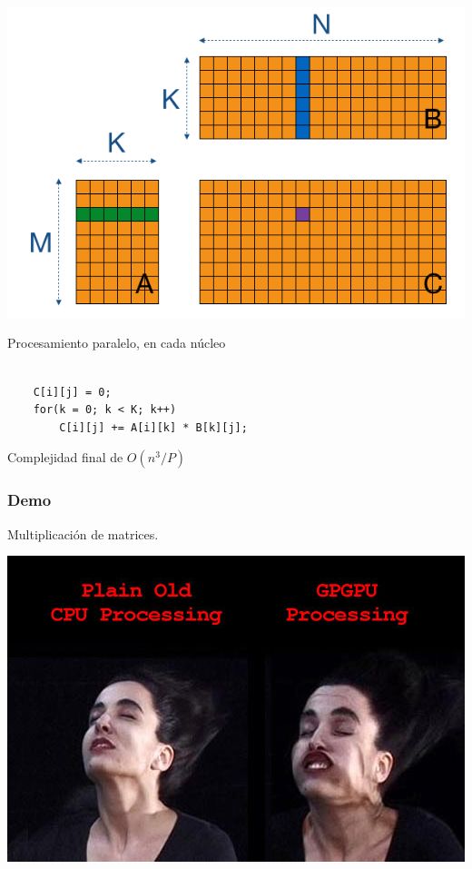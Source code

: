\documentclass{beamer}
\begin{document}
\begin{frame}
\includegraphics[width=\linewidth]{mat-mul.png}
\end{frame}



\begin{frame}[fragile]
Procesamiento paralelo, en cada núcleo

\begin{lstlisting}

    C[i][j] = 0;
    for(k = 0; k < K; k++)
        C[i][j] += A[i][k] * B[k][j];

\end{lstlisting}

Complejidad final de $ O(n^3 / P) $

\end{frame}



\begin{frame}
\frametitle{Demo}
Multiplicación de matrices.
\end{frame}



\begin{frame}
\includegraphics[width=\linewidth]{aire-cara.jpg}
\end{frame}
\end{document}
